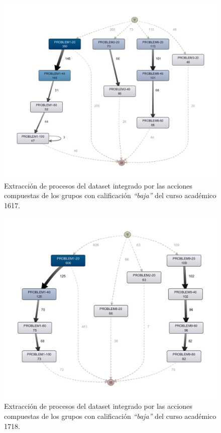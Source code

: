 \begin{figure}[H]
    \centering
    \includegraphics[width=1.25\textwidth]{imagenes/DISCO_compound/Year1617WorstGrades.png}
    \caption{Extracción de procesos del dataset integrado por las acciones compuestas de los grupos con calificación \emph{``baja''} del curso académico 1617.}
    \label{fig:year1617WorstGrades}
\end{figure}

\begin{figure}[H]
    \centering
    \includegraphics[width=1.25\textwidth]{imagenes/DISCO_compound/Year1718WorstGrades.png}
    \caption{Extracción de procesos del dataset integrado por las acciones compuestas de los grupos con calificación \emph{``baja''} del curso académico 1718.}
    \label{fig:year1718WorstGrades}
\end{figure}

